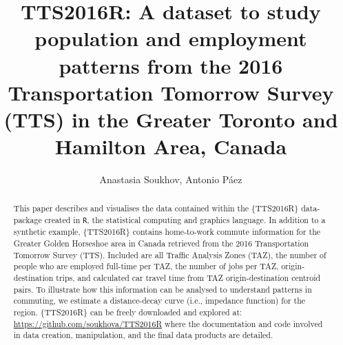\documentclass[Royal,times,sageh]{sagej}
\begin{document}

\title{TTS2016R: A dataset to study population and employment patterns
from the 2016 Transportation Tomorrow Survey (TTS) in the Greater
Toronto and Hamilton Area, Canada}

\runninghead{}

\author{Anastasia Soukhov\affilnum{}, Antonio Páez\affilnum{}}

\affiliation{\affilnum{}{}}



\begin{abstract}
This paper describes and visualises the data contained within the
\{TTS2016R\} data-package created in \texttt{R}, the statistical
computing and graphics language. In addition to a synthetic example,
\{TTS2016R\} contains home-to-work commute information for the Greater
Golden Horseshoe area in Canada retrieved from the 2016 Transportation
Tomorrow Survey (TTS). Included are all Traffic Analysis Zones (TAZ),
the number of people who are employed full-time per TAZ, the number of
jobs per TAZ, origin-destination trips, and calculated car travel time
from TAZ origin-destination centroid pairs. To illustrate how this
information can be analysed to understand patterns in commuting, we
estimate a distance-decay curve (i.e., impedance function) for the
region. \{TTS2016R\} can be freely downloaded and explored at:
\url{https://github.com/soukhova/TTS2016R} where the documentation and
code involved in data creation, manipulation, and the final data
products are detailed.
\end{abstract}


\maketitle
\end{document}
